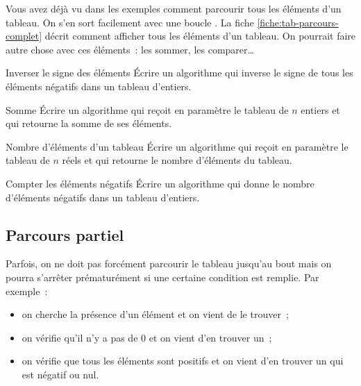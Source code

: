 			Vous avez déjà vu dans les exemples
			comment parcourir tous les éléments d’un tableau.
			On s’en sort facilement avec une boucle .
			La fiche \vref{fiche:tab-parcours-complet}
			décrit comment afficher tous les éléments d’un tableau.
			On pourrait faire autre chose avec ces éléments~:
			les sommer, les comparer\dots
				
			\begin{Exercice}{Inverser le signe des éléments}
				Écrire un algorithme qui 
				inverse le signe de tous les éléments négatifs dans un tableau d’entiers.
			\end{Exercice}

			\begin{Exercice}{Somme}
				Écrire un algorithme qui reçoit en paramètre le tableau
				 de $n$ entiers 
				et qui retourne la somme de ses éléments.
			\end{Exercice}

			\begin{Exercice}{Nombre d’éléments d’un tableau}
				Écrire un algorithme qui reçoit en paramètre le tableau
				 de $n$ réels et qui
				retourne le nombre d’éléments du tableau.
			\end{Exercice}
			
			\begin{Exercice}{Compter les éléments négatifs}
				Écrire un algorithme qui
				donne le nombre d’éléments négatifs dans un tableau d’entiers.
			\end{Exercice}

		\subsection{Parcours partiel}
		
			Parfois, on ne doit pas forcément parcourir 
			le tableau jusqu’au bout
			mais on pourra s’arrêter prématurément 
			si une certaine condition est remplie.
			Par exemple~:
			\begin{itemize}
			\item 
				on cherche la présence d’un élément et on vient de le trouver~;
			\item 
				on vérifie qu’il n’y a pas de $0$ et on vient d’en trouver un~;
			\item
				on vérifie que tous les éléments sont positifs
				et on vient d’en trouver un qui est négatif ou nul.
			\end{itemize}
	
